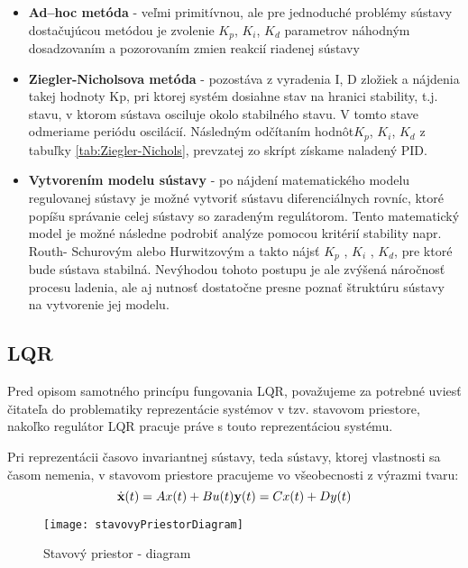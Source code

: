 \begin{itemize}
\item \textbf{Ad–hoc metóda} - veľmi primitívnou, ale pre jednoduché problémy sústavy dostačujúcou metódou je zvolenie $K_p$, $K_i$, $K_d$ parametrov náhodným dosadzovaním a pozorovaním zmien reakcií riadenej sústavy
\item \textbf{Ziegler-Nicholsova metóda} - pozostáva z vyradenia I, D zložiek a nájdenia takej hodnoty Kp, pri ktorej systém dosiahne stav na hranici stability, t.j. stavu, v ktorom sústava osciluje okolo stabilného stavu. V tomto stave odmeriame periódu oscilácií. Následným odčítaním hodnôt$K_p$, $K_i$, $K_d$ z tabuľky \ref{tab:Ziegler-Nichols}, prevzatej zo skrípt\cite{SKRIPTA} získame naladený PID.
\item \textbf{Vytvorením modelu sústavy} - po nájdení matematického modelu regulovanej 	sústavy je možné vytvoriť sústavu diferenciálnych rovníc, ktoré popíšu správanie celej sústavy so zaradeným regulátorom. Tento matematický model je možné následne podrobiť analýze pomocou kritérií stability napr. Routh-	Schurovým alebo Hurwitzovým a takto nájsť  $K_p$ , $K_i$ , $K_d$, pre ktoré bude sústava stabilná. Nevýhodou tohoto postupu je ale zvýšená náročnosť procesu ladenia, ale aj nutnosť dostatočne presne poznať štruktúru sústavy na 	vytvorenie jej modelu.  
\end{itemize}

\subsection{LQR}

Pred opisom samotného princípu fungovania LQR, považujeme za potrebné uviesť čitateľa do problematiky reprezentácie systémov v tzv. stavovom priestore, nakoľko regulátor LQR pracuje práve s touto reprezentáciou systému.

Pri reprezentácii časovo invariantnej sústavy, teda sústavy, ktorej vlastnosti sa časom nemenia, v stavovom priestore pracujeme vo všeobecnosti z výrazmi tvaru:
\begin{equation}
\dot {\textbf{x}}(t) = Ax(t) + Bu(t) \linebreak
\textbf {y}(t) = Cx(t) + Dy(t)  
\end{equation}
\begin{figure}[h]
\centering
\texttt{[image: stavovyPriestorDiagram]}
\caption{Stavový priestor - diagram}
\label{fig:stavovyPriestorDiagram}
\end{figure}

